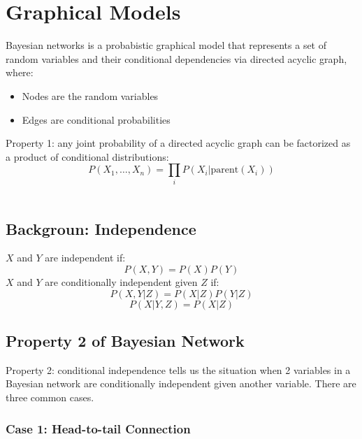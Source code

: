 \chapter{Graphical Models}

\begin{multicols*}{2}
\noindent Bayesian networks is a probabistic graphical model that represents a set of random variables and their conditional dependencies via directed acyclic graph, where:
\begin{itemize}
    \item Nodes are the random variables
    \item Edges are conditional probabilities
\end{itemize}

\noindent Property 1: any joint probability of a directed acyclic graph can be factorized as a product of conditional distributions:
$$P(X_1,\ldots,X_n) = \prod_i P(X_i|\text{parent}(X_i))$$ \\

\section{Backgroun: Independence}

\noindent $X$ and $Y$ are independent if:
$$P(X,Y) = P(X)P(Y)$$
\noindent $X$ and $Y$ are conditionally independent given $Z$ if:
$$P(X,Y|Z) = P(X|Z) P(Y|Z)$$
$$P(X|Y,Z) = P(X|Z)$$

\section{Property 2 of Bayesian Network}

\noindent Property 2: conditional independence tells us the situation when 2 variables in a Bayesian network are conditionally independent given another variable. There are three common cases.

\subsection{Case 1: Head-to-tail Connection}
\begin{center}
\end{center}


\end{multicols*}

